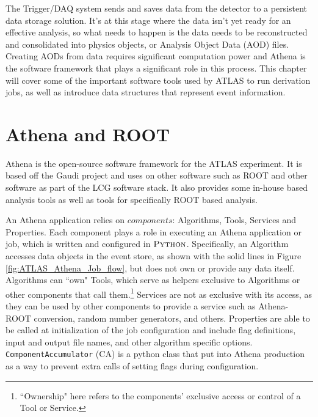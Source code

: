 The Trigger/DAQ system sends and saves data from the detector to a persistent data storage solution.
It's at this stage where the data isn't yet ready for an effective analysis, so what needs to happen is the data needs to be reconstructed and consolidated into physics objects, or Analysis Object Data (AOD) files.
Creating AODs from data requires significant computation power and Athena is the software framework that plays a significant role in this process.
This chapter will cover some of the important software tools used by ATLAS to run derivation jobs, as well as introduce data structures that represent event information. 

\section{Athena and ROOT}
Athena is the open-source software framework for the ATLAS experiment.\cite{athena}
It is based off the Gaudi project and uses on other software such as ROOT and other software as part of the LCG software stack.
It also provides some in-house based analysis tools as well as tools for specifically ROOT based analysis.

An Athena application relies on $\textit{components}$: Algorithms, Tools, Services and Properties. \cite{Aad:2895022}  
Each component plays a role in executing an Athena application or job, which is written and configured in $\textsc{Python}$.
Specifically, an Algorithm accesses data objects in the event store, as shown with the solid lines in Figure \ref{fig:ATLAS_Athena_Job_flow}, but does not own or provide any data itself.
Algorithms can ``own" Tools, which serve as helpers exclusive to Algorithms or other components that call them.\footnote{``Ownership" here refers to the components' exclusive access or control of a Tool or Service.} 
Services are not as exclusive with its access, as they can be used by other components to provide a service such as Athena-ROOT conversion, random number generators, and others. 
Properties are able to be called at initialization of the job configuration and include flag definitions, input and output file names, and other algorithm specific options.
\verb|ComponentAccumulator| (CA) is a python class that put into Athena production as a way to prevent extra calls of setting flags during configuration. 

